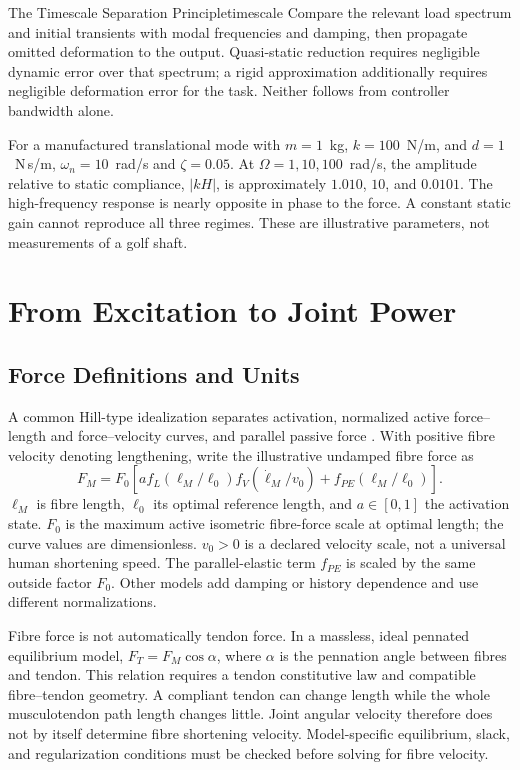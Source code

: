 \begin{principle}{The Timescale Separation Principle}{timescale}
Compare the relevant load spectrum and initial transients with modal
frequencies and damping, then propagate omitted deformation to the output.
Quasi-static reduction requires negligible dynamic error over that spectrum;
a rigid approximation additionally requires negligible deformation error for
the task. Neither follows from controller bandwidth alone.
\end{principle}

For a manufactured translational mode with $m=1$~kg, $k=100$~N/m, and
$d=1$~N\,s/m, $\omega_n=10$~rad/s and $\zeta=0.05$.
At $\Omega=1,10,100$~rad/s, the amplitude relative to static compliance,
$|kH|$, is approximately $1.010$, $10$, and $0.0101$. The high-frequency
response is nearly opposite in phase to the force. A constant static gain
cannot reproduce all three regimes. These are illustrative parameters,
not measurements of a golf shaft.

\section{From Excitation to Joint Power}
\subsection{Force Definitions and Units}

A common Hill-type idealization separates activation, normalized active
force--length and force--velocity curves, and parallel passive force
\cite{millard2013flexing}. With positive fibre velocity denoting lengthening,
write the illustrative undamped fibre force as
\begin{equation}
 F_M=F_0\left[a f_L(\ell_M/\ell_0)f_V(\dot\ell_M/v_0)
                         +f_{PE}(\ell_M/\ell_0)\right].
 \label{eq:ch1:hill-overview}
\end{equation}
$\ell_M$ is fibre length, $\ell_0$ its optimal reference length, and
$a\in[0,1]$ the activation state. $F_0$ is the maximum active isometric
fibre-force scale at optimal length; the curve values are dimensionless.
$v_0>0$ is a declared velocity scale, not a universal human shortening speed.
The parallel-elastic term $f_{PE}$ is scaled by the same outside factor $F_0$.
Other models
add damping or history dependence and use different normalizations.

Fibre force is not automatically tendon force. In a massless, ideal pennated
equilibrium model, $F_T=F_M\cos\alpha$, where $\alpha$ is the pennation angle
between fibres and tendon. This relation requires a tendon constitutive
law and compatible fibre--tendon geometry. A compliant tendon can change
length while the whole musculotendon path length changes little. Joint
angular velocity therefore does not by itself determine fibre shortening
velocity. Model-specific equilibrium, slack, and regularization conditions
must be checked before solving for fibre velocity.

